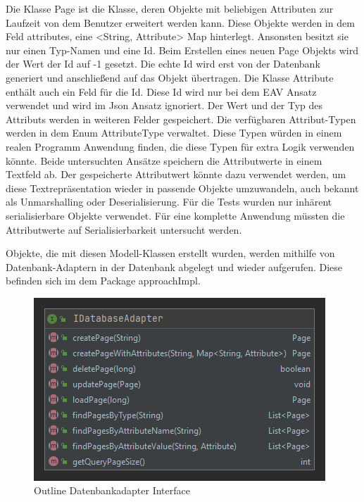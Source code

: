 Die Klasse Page ist die Klasse, deren Objekte mit beliebigen Attributen zur Laufzeit von dem Benutzer erweitert werden kann. Diese Objekte werden in dem Feld attributes, eine <String, Attribute> Map hinterlegt. Ansonsten besitzt sie nur einen Typ-Namen und eine Id. Beim Erstellen eines neuen Page Objekts wird der Wert der Id auf -1 gesetzt. Die echte Id wird erst von der Datenbank generiert und anschließend auf das Objekt übertragen.
Die Klasse Attribute enthält auch ein Feld für die Id. Diese Id wird nur bei dem EAV Ansatz verwendet und wird im Json Ansatz ignoriert. Der Wert und der Typ des Attributs werden in weiteren Felder gespeichert. Die verfügbaren Attribut-Typen werden in dem Enum AttributeType verwaltet. Diese Typen würden in einem realen Programm Anwendung finden, die diese Typen für extra Logik verwenden könnte. Beide untersuchten Ansätze speichern die Attributwerte in einem Textfeld ab. Der gespeicherte Attributwert könnte dazu verwendet werden, um diese Textrepräsentation wieder in passende Objekte umzuwandeln, auch bekannt als Unmarshalling oder Deserialisierung. Für die Tests wurden nur inhärent serialisierbare Objekte verwendet. Für eine komplette Anwendung müssten die Attributwerte auf Serialisierbarkeit untersucht werden.

Objekte, die mit diesen Modell-Klassen erstellt wurden, werden mithilfe von Datenbank-Adaptern in der Datenbank abgelegt und wieder aufgerufen. Diese befinden sich im dem Package approachImpl.


\begin{figure}[h]
\centering
\includegraphics[scale=2.5]{bilder/adapterInterface.png}
\caption{Outline Datenbankadapter Interface}
\end{figure}


